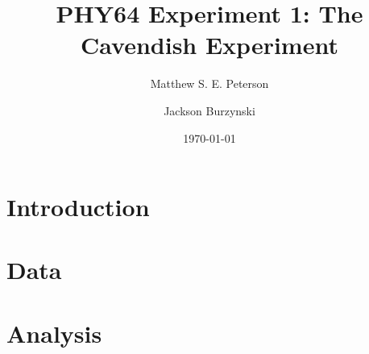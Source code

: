 \documentclass[aps, reprint,amsmath,amssymb]{revtex4-1} %
\begin{document}
\title{PHY64 Experiment 1: The Cavendish Experiment}
\author{Matthew S. E. Peterson}
\author{Jackson Burzynski}
\date{\today} 
\maketitle

\section{Introduction}

\section{Data}

\section{Analysis}
\end{document}
